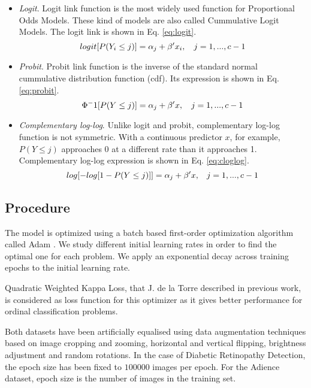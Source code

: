 \documentclass[10pt, a4paper, titlepage]{article}
\begin{document}
\begin{multicols}{2}
	\begin{itemize}
		\item \textit{Logit}. Logit link function is the most widely used function for Proportional Odds Models. These kind of models are also called Cummulative Logit Models. The logit link is shown in Eq. \ref{eq:logit}.
		\begin{equation}
		\small
		logit[P(Y_i \le j)] = \alpha_j + \beta'x_i,\quad j = 1, ..., c - 1
		\label{eq:logit}
		\end{equation}
		\item \textit{Probit}. Probit link function is the inverse of the standard normal cummulative distribution function (cdf). Its expression is shown in Eq. \ref{eq:probit}.	
		\begin{equation}
		\small
		\Phi^-1[P(Y \le j)] = \alpha_j + \beta'x,\quad j = 1, ..., c - 1
		\label{eq:probit}
		\end{equation}
		\item \textit{Complementary log-log}. Unlike logit and probit, complementary log-log function is not symmetric. With a continuous predictor $x$, for example, $P(Y \le j)$ approaches 0 at a different rate than it approaches 1. Complementary log-log expression is shown in Eq. \ref{eq:cloglog}.
		\begin{equation}
		\footnotesize
		log[-log[1 - P(Y \le j)]] = \alpha_j + \beta'x,\quad j = 1, ..., c - 1
		\label{eq:cloglog}
		\end{equation}
	\end{itemize}
	
	\subsection{Procedure}
	The model is optimized using a batch based first-order optimization algorithm called Adam \cite{kingma2014adam}. We study different initial learning rates in order to find the optimal one for each problem. We apply an exponential decay across training epochs to the initial learning rate.
	
	Quadratic Weighted Kappa Loss, that J. de la Torre described in previous work, is considered as loss function for this optimizer as it gives better performance for ordinal classification problems.
	
	Both datasets have been artificially equalised using data augmentation techniques \cite{van2001art}\cite{krizhevsky2012imagenet} based on image cropping and zooming, horizontal and vertical flipping, brightness adjustment and random rotations. In the case of Diabetic Retinopathy Detection, the epoch size has been fixed to $100000$ images per epoch. For the Adience dataset, epoch size is the number of images in the training set.
	

\end{multicols}
\end{document}
